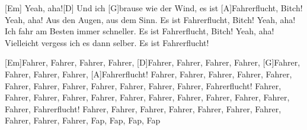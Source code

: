 \begin{guitar}
	[Em] Yeah, aha![D] Und ich [G]brause wie der Wind, es ist [A]Fahrerflucht, Bitch!
	Yeah, aha! Aus den Augen, aus dem Sinn. Es ist Fahrerflucht, Bitch!
	Yeah, aha! Ich fahr am Besten immer schneller. Es ist Fahrerflucht, Bitch!
	Yeah, aha! Vielleicht vergess ich es dann selber. Es ist Fahrerflucht!
	
	[Em]Fahrer, Fahrer, Fahrer, Fahrer, [D]Fahrer, Fahrer, Fahrer, Fahrer,
	[G]Fahrer, Fahrer, Fahrer, Fahrer, [A]Fahrerflucht!
	Fahrer, Fahrer, Fahrer, Fahrer, Fahrer, Fahrer, Fahrer, Fahrer,
	Fahrer, Fahrer, Fahrer, Fahrer, Fahrerflucht!
	Fahrer, Fahrer, Fahrer, Fahrer, Fahrer, Fahrer, Fahrer, Fahrer,
	Fahrer, Fahrer, Fahrer, Fahrer, Fahrerflucht!
	Fahrer, Fahrer, Fahrer, Fahrer, Fahrer, Fahrer, Fahrer, Fahrer,
	Fahrer, Fahrer, Fap, Fap, Fap, Fap
	
	\begin{highlightbar}
		  
	\end{highlightbar}
\end{guitar}
